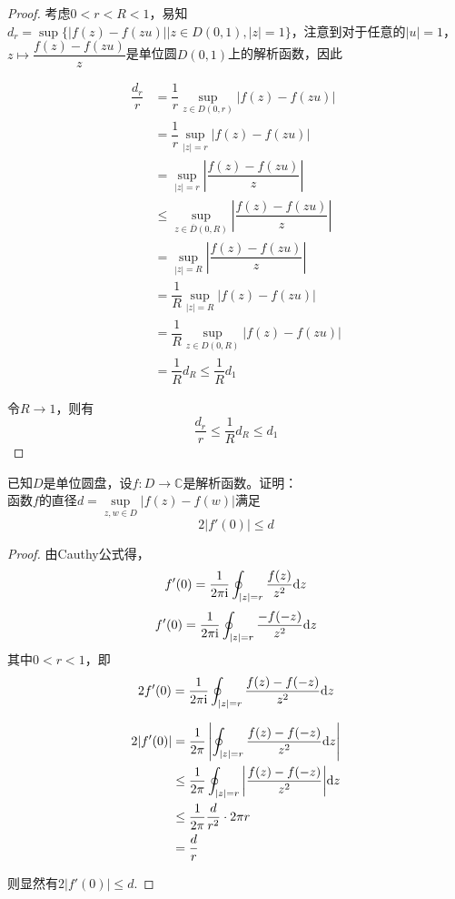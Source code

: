 \begin{proof}

    考虑$0 < r < R < 1$，易知$d_r = \sup\{|f(z) - f(zu)| \big| z \in D(0, 1), |z| = 1 \}$，注意到对于任意的$|u| = 1$，$z \mapsto  \dfrac{f(z) - f(zu)}{z}$是单位圆$D(0, 1)$上的解析函数，因此
    
    \begin{align*}
        \dfrac{d_r}{r} & = \dfrac{1}{r} \sup_{z \in D(0, r)}{|f(z) - f(zu)|} \\
        & = \dfrac{1}{r} \sup_{|z| = r}{|f(z) - f(zu)|} \\
        & = \sup_{|z| = r}{\left| \dfrac{f(z) - f(zu)}{z} \right|} \\
        & \leq \sup_{z \in \overline{D}(0, R)}{\left| \dfrac{f(z) - f(zu)}{z} \right|} \\
        & = \sup_{|z| = R}{\left| \dfrac{f(z) - f(zu)}{z} \right|} \\
        & = \dfrac{1}{R} \sup_{|z| = R}{|f(z) - f(zu)|} \\
        & = \dfrac{1}{R} \sup_{z \in D(0, R)}{|f(z) - f(zu)|} \\
        & = \dfrac{1}{R} d_{R} \leq \dfrac{1}{R} d_{1}
    \end{align*}

    令$R \to 1$，则有
    \[\dfrac{d_{r}}{r} \leq \dfrac{1}{R} d_{R} \leq d_1\]

\end{proof}

\begin{proposition}

    已知$D$是单位圆盘，设$f:D \to \mathbb{C}$是解析函数。证明：\\
    函数$f$的直径$d = \sup\limits_{z, w \in D}{|f(z) - f(w)|}$满足
    \[2|f'(0)| \leq d\]

\end{proposition}

\begin{proof}

    由\textup{Cauthy}公式得，
    \[f'(0) = \dfrac{1}{2\pi \mathrm{i}} \oint_{|z| = r}{\dfrac{f(z)}{z^2}}\mathrm{d} z\]
    \[f'(0) = \dfrac{1}{2\pi \mathrm{i}} \oint_{|z| = r}{\dfrac{-f(-z)}{z^2}}\mathrm{d} z\]
    其中$0 < r < 1$，即
    \[2f'(0) = \dfrac{1}{2\pi \mathrm{i}} \oint_{|z| = r}{\dfrac{f(z) - f(-z)}{z^2}}\mathrm{d} z\]

    \begin{align*}
        2|f'(0)| & = \dfrac{1}{2 \pi} \left| \oint_{|z| = r}{\dfrac{f(z) - f(-z)}{z^2}}\mathrm{d} z \right| \\
        & \leq \dfrac{1}{2 \pi} \oint_{|z| = r}{\left| \dfrac{f(z) - f(-z)}{z^2} \right|}\mathrm{d} z \\
        & \leq \dfrac{1}{2 \pi} \dfrac{d}{r^2} \cdot 2 \pi r \\
        & = \dfrac{d}{r}
    \end{align*}

    则显然有$2|f'(0)| \leq d$.

\end{proof}

